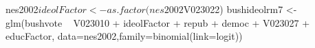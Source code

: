 \begin{Schunk}
\begin{Sinput}
 nes2002$ideolFactor <- as.factor(nes2002$V023022)
 bushideolrm7 <- glm(bushvote ~ V023010 + ideolFactor + repub + democ + V023027 + educFactor, data=nes2002,family=binomial(link=logit))
\end{Sinput}
\end{Schunk}
